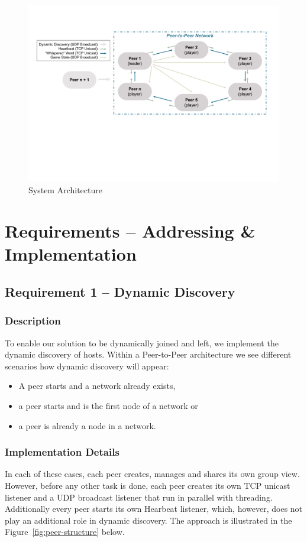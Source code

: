 \documentclass[runningheads]{llncs}
\begin{document}
        \begin{figure}
            \includegraphics[width=\textwidth]{architecture.pdf}
            \caption{System Architecture} \label{fig:architecture}
        \end{figure}

\section{Requirements -- Addressing \& Implementation}
    \subsection{Requirement 1 -- Dynamic Discovery} \label{sec:dynamic-discovery}
        \subsubsection{Description}
            To enable our solution to be dynamically joined and left, we implement the dynamic discovery of hosts. Within a Peer-to-Peer architecture we see different scenarios how dynamic discovery will appear: 
            \begin{itemize}
                \item A peer starts and a network already exists, 
                \item a peer starts and is the first node of a network or 
                \item a peer is already a node in a network.
            \end{itemize}
            
        \subsubsection{Implementation Details}
            In each of these cases, each peer creates, manages and shares its own group view. However, before any other task is done, each peer creates its own TCP unicast listener and a UDP broadcast listener that run in parallel with threading. Additionally every peer starts its own Hearbeat listener, which, however, does not play an additional role in dynamic discovery. The approach is illustrated in the Figure~\ref{fig:peer-structure} below.
            
\end{document}

